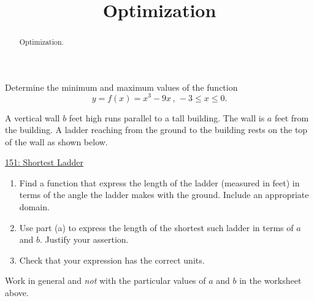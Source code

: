 \documentclass{ximera}
\title{Optimization}
\begin{document}
\begin{abstract}
Optimization.
\end{abstract}
\maketitle


\begin{question} \label{Q545hhghnnggZ}
Determine the minimum and maximum values of the function
\[
     y = f(x) = x^3 - 9x \, , \, -3\leq x \leq 0 .
\]
\end{question}


\begin{question}  \label{Q0t0gogppdga}

A vertical wall $b$ feet high runs parallel to a tall building. The wall is $a$ feet from the building. A ladder reaching from the ground to the building rests on the top of the wall as shown below.

\begin{onlineOnly}
   \begin{center}
\end{center}
\end{onlineOnly}

\href{https://www.desmos.com/calculator/4ak46ub8ay}{151: Shortest Ladder}


\begin{enumerate}
\item Find a function that express the length of the ladder (measured in feet) in terms of the angle the ladder makes with the ground. Include an appropriate domain.

\item Use part (a) to express the length of the shortest such ladder in terms of $a$ and $b$. Justify your assertion. 

\item Check that your expression has the correct units.

\end{enumerate}

Work in general and \emph{not} with the particular values of $a$ and $b$ in the worksheet above.

\end{question} 
\end{document}

